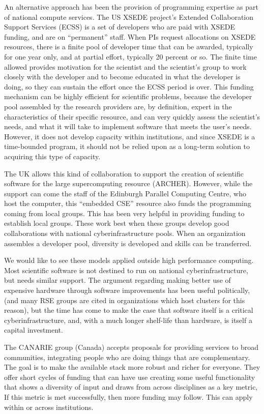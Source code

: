 An alternative approach has been the provision of programming expertise as part
of national compute services. The US XSEDE project's Extended Collaboration Support 
Services (ECSS) is a set of developers who are paid with XSEDE funding, and are
on ``permanent'' staff. When PIs request allocations on XSEDE resources, there
is a finite pool of developer time that can be awarded, typically for one year
only, and at partial effort, typically 20 percent or so. The finite time allowed
provides motivation for the scientist and the scientist's group to work closely with the
developer and to become educated in what the developer is doing, so they can
sustain the effort once the ECSS period is over. This funding mechanism can be
highly efficient for scientific problems, because the developer pool assembled
by the research providers are, by definition, expert in the characteristics of
their specific resource, and can very quickly assess the scientist's needs, and
what it will take to implement software that meets the user's needs. However, it
does not develop capacity within institutions, and since XSEDE is a time-bounded
program, it should not be relied upon as a long-term solution to acquiring this
type of capacity.

The UK allows this kind of collaboration to support the creation of scientific
software for the large supercomputing resource (ARCHER). However, while the
support can come the staff of the Edinburgh Parallel Computing Centre,
who host the computer, this ``embedded CSE'' resource also funds the
programming coming from local groups. This has been very helpful in providing
funding to establish local groups. These work best when these groups develop good
collaborations with national cyberinfrastructure pools. When an organization
assembles a developer pool, diversity is developed and skills can be
transferred.

We would like to see these models applied outside high performance computing.
Most scientific software is not destined to run on national cyberinfrastructure,
but needs similar support. The argument regarding making better use of expensive
hardware through software improvements has been useful politically, (and many
RSE groups are cited in organizations which host clusters for this reason), but
the time has come to make the case that software itself is a critical
cyberinfrastructure, and, with a much longer shelf-life than hardware, is itself
a capital investment.

The CANARIE group (Canada) accepts proposals for providing services to broad
communities, integrating people who are doing things that are complementary. The
goal is to make the available stack more robust and richer for everyone. They
offer short cycles of funding that can have use creating some useful
functionality that shows a diversity of input and draws from across disciplines as a key metric,  If this metric is met successfully, 
then more funding may follow. This can apply within or across institutions.

